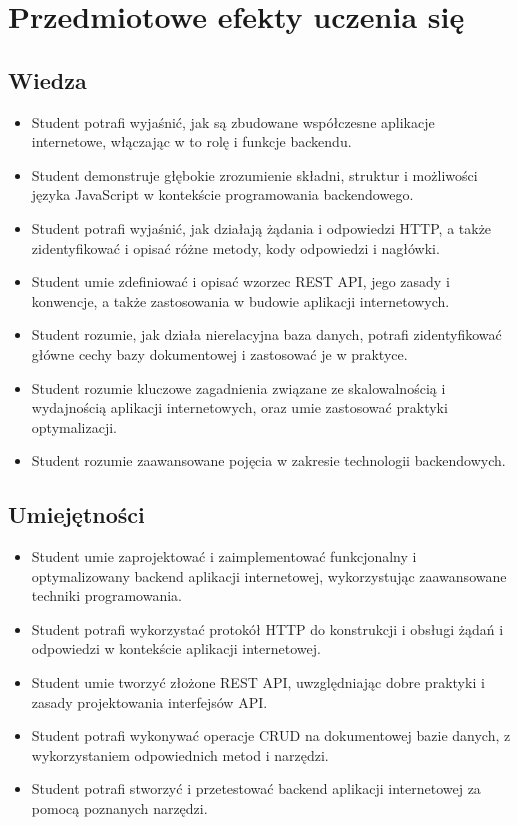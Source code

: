 \documentclass[12pt, a4paper]{article}
\begin{document}
\section{Przedmiotowe efekty uczenia się}

\subsection*{Wiedza}
\begin{itemize}
  \item Student potrafi wyjaśnić, jak są zbudowane współczesne aplikacje internetowe, włączając w to rolę i funkcje backendu.
  \item Student demonstruje głębokie zrozumienie składni, struktur i możliwości języka JavaScript w kontekście programowania backendowego.
  \item Student potrafi wyjaśnić, jak działają żądania i odpowiedzi HTTP, a także zidentyfikować i opisać różne metody, kody odpowiedzi i nagłówki.
  \item Student umie zdefiniować i opisać wzorzec REST API, jego zasady i konwencje, a także zastosowania w budowie aplikacji internetowych.
  \item Student rozumie, jak działa nierelacyjna baza danych, potrafi zidentyfikować główne cechy bazy dokumentowej i zastosować je w praktyce.
  \item Student rozumie kluczowe zagadnienia związane ze skalowalnością i wydajnością aplikacji internetowych, oraz umie zastosować praktyki optymalizacji.
  \item Student rozumie zaawansowane pojęcia w zakresie technologii backendowych.
\end{itemize}

\subsection*{Umiejętności}
\begin{itemize}
  \item Student umie zaprojektować i zaimplementować funkcjonalny i optymalizowany backend aplikacji internetowej, wykorzystując zaawansowane techniki programowania.
  \item Student potrafi wykorzystać protokół HTTP do konstrukcji i obsługi żądań i odpowiedzi w kontekście aplikacji internetowej.
  \item Student umie tworzyć złożone REST API, uwzględniając dobre praktyki i zasady projektowania interfejsów API.
  \item Student potrafi wykonywać operacje CRUD na dokumentowej bazie danych, z wykorzystaniem odpowiednich metod i narzędzi.
  \item Student potrafi stworzyć i przetestować backend aplikacji internetowej za pomocą poznanych narzędzi.
\end{itemize}
\end{document}
